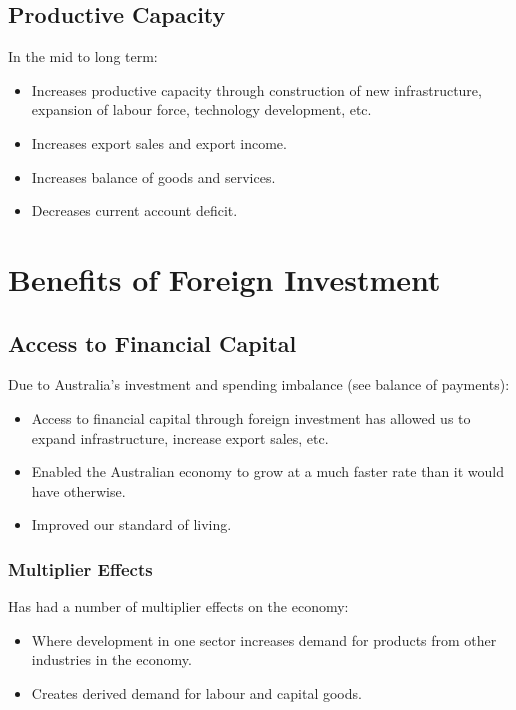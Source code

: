 \documentclass[a4paper,11pt]{report}
\begin{document}
\subsection{Productive Capacity}

In the mid to long term:

\begin{itemize}
\item Increases productive capacity through construction of new infrastructure,
	expansion of labour force, technology development, etc.
\item Increases export sales and export income.
\item Increases balance of goods and services.
\item Decreases current account deficit.
\end{itemize}


\section{Benefits of Foreign Investment}

\subsection{Access to Financial Capital}

Due to Australia's investment and spending imbalance (see balance of payments):

\begin{itemize}
\item Access to financial capital through foreign investment has allowed us to
	expand infrastructure, increase export sales, etc.
\item Enabled the Australian economy to grow at a much faster rate than it
	would have otherwise.
\item Improved our standard of living.
\end{itemize}

\subsubsection{Multiplier Effects}

Has had a number of multiplier effects on the economy:

\begin{itemize}
\item Where development in one sector increases demand for products from other
	industries in the economy.
\item Creates derived demand for labour and capital goods.
\end{itemize}
\end{document}
